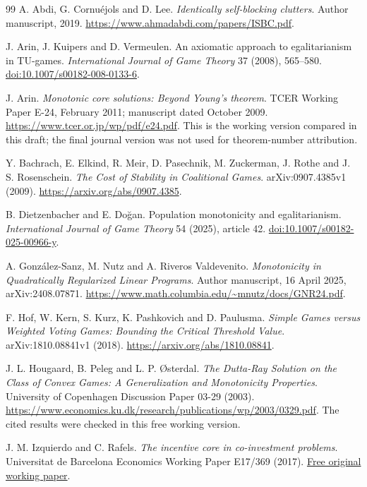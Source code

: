 \documentclass[11pt]{article}
\theoremstyle{definition}
\theoremstyle{remark}
\begin{document}
\begin{thebibliography}{99}
A. Abdi, G. Cornu\'{e}jols and D. Lee.
\emph{Identically self-blocking clutters}. Author manuscript, 2019.
\url{https://www.ahmadabdi.com/papers/ISBC.pdf}.

J. Arin, J. Kuipers and D. Vermeulen.
An axiomatic approach to egalitarianism in TU-games.
\emph{International Journal of Game Theory} 37 (2008), 565--580.
\href{https://doi.org/10.1007/s00182-008-0133-6}{doi:10.1007/s00182-008-0133-6}.

J. Arin. \emph{Monotonic core solutions: Beyond Young's theorem}.
TCER Working Paper E-24, February 2011; manuscript dated October 2009.
\url{https://www.tcer.or.jp/wp/pdf/e24.pdf}.
This is the working version compared in this draft; the final journal version
was not used for theorem-number attribution.

Y. Bachrach, E. Elkind, R. Meir, D. Pasechnik, M. Zuckerman,
J. Rothe and J. S. Rosenschein.
\emph{The Cost of Stability in Coalitional Games}.
arXiv:0907.4385v1 (2009).
\url{https://arxiv.org/abs/0907.4385}.

B. Dietzenbacher and E. Do\u{g}an.
Population monotonicity and egalitarianism.
\emph{International Journal of Game Theory} 54 (2025), article 42.
\href{https://doi.org/10.1007/s00182-025-00966-y}{doi:10.1007/s00182-025-00966-y}.

A. Gonz\'{a}lez-Sanz, M. Nutz and A. Riveros Valdevenito.
\emph{Monotonicity in Quadratically Regularized Linear Programs}.
Author manuscript, 16 April 2025, arXiv:2408.07871.
\url{https://www.math.columbia.edu/~mnutz/docs/GNR24.pdf}.

F. Hof, W. Kern, S. Kurz, K. Pashkovich and D. Paulusma.
\emph{Simple Games versus Weighted Voting Games: Bounding the Critical Threshold Value}.
arXiv:1810.08841v1 (2018).
\url{https://arxiv.org/abs/1810.08841}.

J. L. Hougaard, B. Peleg and L. P. \O sterdal.
\emph{The Dutta-Ray Solution on the Class of Convex Games:
A Generalization and Monotonicity Properties}.
University of Copenhagen Discussion Paper 03-29 (2003).
\url{https://www.economics.ku.dk/research/publications/wp/2003/0329.pdf}.
The cited results were checked in this free working version.

J. M. Izquierdo and C. Rafels.
\emph{The incentive core in co-investment problems}.
Universitat de Barcelona Economics Working Paper E17/369 (2017).
\href{https://diposit.ub.edu/server/api/core/bitstreams/d325b225-7dde-44ff-8a35-cd848434e593/content}{Free original working paper}.


\end{thebibliography}
\end{document}
